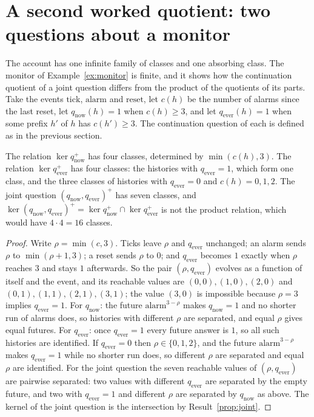 \section{A second worked quotient: two questions about a monitor}\label{sec:monitor-quotient}

The account has one infinite family of classes and one absorbing class. The monitor of Example~\ref{ex:monitor} is finite, and it shows how the continuation quotient of a joint question differs from the product of the quotients of its parts. Take the events $\mathrm{tick}$, $\mathrm{alarm}$ and $\mathrm{reset}$, let $c(h)$ be the number of alarms since the last reset, let $q_{\mathrm{now}}(h)=1$ when $c(h)\ge3$, and let $q_{\mathrm{ever}}(h)=1$ when some prefix $h'$ of $h$ has $c(h')\ge3$. The continuation question of each is defined as in the previous section.

\begin{newresult}\label{prop:monitor-quotients}
The relation $\ker q_{\mathrm{now}}^{+}$ has four classes, determined by $\min(c(h),3)$. The relation $\ker q_{\mathrm{ever}}^{+}$ has four classes: the histories with $q_{\mathrm{ever}}=1$, which form one class, and the three classes of histories with $q_{\mathrm{ever}}=0$ and $c(h)=0,1,2$. The joint question $(q_{\mathrm{now}},q_{\mathrm{ever}})^{+}$ has seven classes, and $\ker(q_{\mathrm{now}},q_{\mathrm{ever}})^{+}=\ker q_{\mathrm{now}}^{+}\cap\ker q_{\mathrm{ever}}^{+}$ is not the product relation, which would have $4\cdot4=16$ classes.
\end{newresult}
\begin{proof}
Write $\rho=\min(c,3)$. Ticks leave $\rho$ and $q_{\mathrm{ever}}$ unchanged; an alarm sends $\rho$ to $\min(\rho+1,3)$; a reset sends $\rho$ to $0$; and $q_{\mathrm{ever}}$ becomes $1$ exactly when $\rho$ reaches $3$ and stays $1$ afterwards. So the pair $(\rho,q_{\mathrm{ever}})$ evolves as a function of itself and the event, and its reachable values are $(0,0),(1,0),(2,0)$ and $(0,1),(1,1),(2,1),(3,1)$; the value $(3,0)$ is impossible because $\rho=3$ implies $q_{\mathrm{ever}}=1$. For $q_{\mathrm{now}}$: the future $\mathrm{alarm}^{3-\rho}$ makes $q_{\mathrm{now}}=1$ and no shorter run of alarms does, so histories with different $\rho$ are separated, and equal $\rho$ gives equal futures. For $q_{\mathrm{ever}}$: once $q_{\mathrm{ever}}=1$ every future answer is $1$, so all such histories are identified. If $q_{\mathrm{ever}}=0$ then $\rho\in\{0,1,2\}$, and the future $\mathrm{alarm}^{3-\rho}$ makes $q_{\mathrm{ever}}=1$ while no shorter run does, so different $\rho$ are separated and equal $\rho$ are identified. For the joint question the seven reachable values of $(\rho,q_{\mathrm{ever}})$ are pairwise separated: two values with different $q_{\mathrm{ever}}$ are separated by the empty future, and two with $q_{\mathrm{ever}}=1$ and different $\rho$ are separated by $q_{\mathrm{now}}$ as above. The kernel of the joint question is the intersection by Result~\ref{prop:joint}.
\end{proof}

